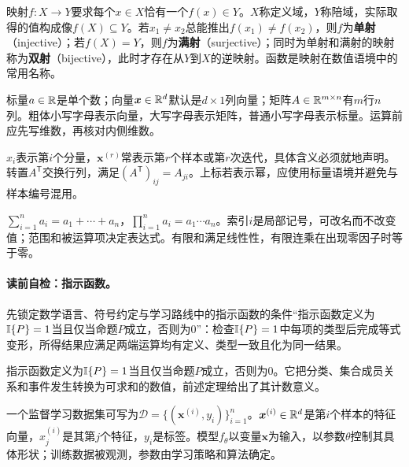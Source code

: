 映射$f:X\to Y$要求每个$x\in X$恰有一个$f(x)\in Y$。$X$称定义域，$Y$称陪域，实际取得的值构成像$f(X)\subseteq Y$。若$x_1\ne x_2$总能推出$f(x_1)\ne f(x_2)$，则$f$为\textbf{单射}（injective）；若$f(X)=Y$，则$f$为\textbf{满射}（surjective）；同时为单射和满射的映射称为\textbf{双射}（bijective），此时才存在从$Y$到$X$的逆映射。函数是映射在数值语境中的常用名称。


标量$a\in\mathbb{R}$是单个数；向量$\boldsymbol{x}\in\mathbb{R}^d$默认是$d\times1$列向量；矩阵$A\in\mathbb{R}^{m\times n}$有$m$行$n$列。粗体小写字母表示向量，大写字母表示矩阵，普通小写字母表示标量。运算前应先写维数，再核对内侧维数。

$x_i$表示第$i$个分量，$\boldsymbol{x}^{(r)}$常表示第$r$个样本或第$r$次迭代，具体含义必须就地声明。转置$A^{\mathsf T}$交换行列，满足$(A^{\mathsf T})_{ij}=A_{ji}$。上标若表示幂，应使用标量语境并避免与样本编号混用。


$\sum_{i=1}^{n}a_i=a_1+\cdots+a_n$，$\prod_{i=1}^{n}a_i=a_1\cdots a_n$。索引$i$是局部记号，可改名而不改变值；范围和被运算项决定表达式。有限和满足线性性，有限连乘在出现零因子时等于零。

\paragraph{读前自检：指示函数。}先锁定数学语言、符号约定与学习路线中的指示函数的条件“指示函数定义为$\mathbb{I}\{P\}=1$当且仅当命题$P$成立，否则为$0$”：检查$\mathbb{I}\{P\}=1$中每项的类型后完成等式变形，所得结果应满足两端运算均有定义、类型一致且化为同一结果。\par

指示函数定义为$\mathbb{I}\{P\}=1$当且仅当命题$P$成立，否则为$0$。它把分类、集合成员关系和事件发生转换为可求和的数值，前述定理给出了其计数意义。


一个监督学习数据集可写为$\mathcal D=\{(\boldsymbol{x}^{(i)},y_i)\}_{i=1}^{n}$。$\boldsymbol{x}^{(i)}\in\mathbb{R}^d$是第$i$个样本的特征向量，$x^{(i)}_j$是其第$j$个特征，$y_i$是标签。模型$f_{\theta}$以变量$\boldsymbol{x}$为输入，以参数$\theta$控制其具体形状；训练数据被观测，参数由学习策略和算法确定。


